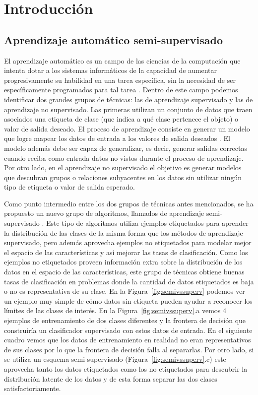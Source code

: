 \chapter{Introducción}
\section{Aprendizaje automático semi-supervisado}

El aprendizaje automático es un campo de las ciencias de la computación que intenta dotar a los sistemas informáticos de la capacidad de aumentar
progresivamente su habilidad en una tarea específica, sin la necesidad de ser específicamente programados para tal tarea \citep{samuel1959some}. Dentro de este
campo podemos identificar dos grandes grupos de técnicas: las de aprendizaje supervisado y las de aprendizaje no supervisado. Las primeras utilizan un conjunto
de datos que traen asociados una etiqueta de clase (que indica a qué clase pertenece el objeto) o valor de salida deseado. El proceso de aprendizaje consiste en
generar un modelo que logre mapear los datos de entrada a los valores de salida deseados \citep{russell2016artificial}. El modelo además debe ser capaz de
generalizar, es decir, generar salidas correctas cuando reciba como entrada datos no vistos durante el proceso de aprendizaje. Por otro lado, en el aprendizaje
no supervisado el objetivo es generar modelos que descubran grupos o relaciones subyacentes en los datos sin utilizar ningún tipo de etiqueta o valor de salida
esperado.

Como punto intermedio entre los dos grupos de técnicas antes mencionados, se ha propuesto un nuevo grupo de algoritmos, llamados de aprendizaje semi-supervisado
\citep{chapelle2006semi}. Este tipo de algoritmos utiliza ejemplos etiquetados para aprender la distribución de las clases de la misma forma que los métodos de
aprendizaje supervisado, pero además aprovecha ejemplos no etiquetados para modelar mejor el espacio de las características y así mejorar las tasas de
clasificación. Como los ejemplos no etiquetados proveen información extra sobre la distribución de los datos en el espacio de las características, este grupo de
técnicas obtiene buenas tasas de clasificación en problemas donde la cantidad de datos etiquetados es baja o no es representativa de su clase.  En la
Figura~\ref{fig:semivssuperv} podemos ver un ejemplo muy simple de cómo datos sin etiqueta pueden ayudar a reconocer los límites de las clases de interés.  En
la Figura~\ref{fig:semivssuperv}.a vemos 4 ejemplos de entrenamiento de dos clases diferentes y la frontera de decisión que construiría un clasificador
supervisado con estos datos de entrada. En el siguiente cuadro vemos que los datos de entrenamiento en realidad no eran representativos de sus clases por lo que
la frontera de decisión falla al separarlas. Por otro lado, si se utiliza un esquema semi-supervisado (Figura~\ref{fig:semivssuperv}.c) este aprovecha tanto los
datos etiquetados como los no etiquetados para descubrir la distribución latente de los datos y de esta forma separar las dos clases satisfactoriamente.


